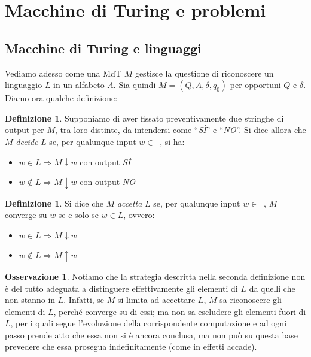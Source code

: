 \documentclass[12pt,a4paper]{report}
\theoremstyle{definition}
\newtheorem{defn}[teo]{Definizione}  %
\newtheorem{oss}[teo]{Osservazione}  %
\DeclareMathOperator{\aaa}{\textit{A}^{\star}}
\begin{document}
\section{Macchine di Turing e problemi}

\subsection{Macchine di Turing e linguaggi}

Vediamo adesso come una MdT $M$ gestisce la questione di riconoscere un linguaggio $L$ in un alfabeto $A$. Sia quindi $M=(Q,A,\delta,q_0)$ per opportuni $Q$ e $\delta$. Diamo ora qualche definizione:

\begin{defn}
Supponiamo di aver fissato preventivamente due stringhe di output per $M$, tra loro distinte, da intendersi come ``\emph{SÌ}'' e ``\emph{NO}''. Si dice allora che $M$ \emph{decide} $L$ se, per qualunque input $w \in \aaa$, si ha:
\begin{itemize}
\item $w \in L \Longrightarrow M \downarrow w$ con output \emph{SÌ}
\item $w \not\in L \Longrightarrow M \downarrow w$ con output \emph{NO}
\end{itemize}
\end{defn}

\begin{defn}
Si dice che $M$ \emph{accetta} $L$ se, per qualunque input $w \in \aaa$, $M$ converge su $w$ se e solo se $w \in L$, ovvero:
\begin{itemize}
\item $w \in L \Longrightarrow M \downarrow w$
\item $w \not\in L \Longrightarrow M \uparrow w$
\end{itemize}
\end{defn}

\begin{oss}\label{decidere_accettare}
Notiamo che la strategia descritta nella seconda definizione non è del tutto adeguata a distinguere effettivamente gli elementi di $L$ da quelli che non stanno in $L$. Infatti, se $M$ si limita ad accettare $L$, $M$ sa riconoscere gli elementi di $L$, perché converge su di essi; ma non sa escludere gli elementi fuori di $L$, per i quali segue l'evoluzione della corrispondente computazione e ad ogni passo prende atto che essa non si è ancora conclusa, ma non può su questa base prevedere che essa prosegua indefinitamente (come in effetti accade).
\end{oss}
\end{document}
